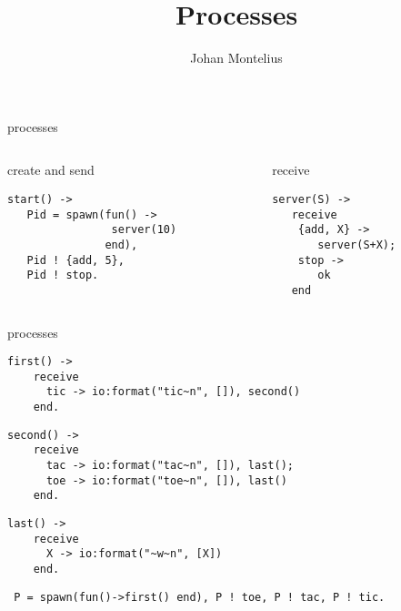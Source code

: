 

\title[ID1019 Processes]{Processes}


\author{Johan Montelius}
\date{\semester}



\begin{frame}
\titlepage
\end{frame}

\begin{frame}[fragile]{processes}

\begin{columns}
   \begin{column}{.5\linewidth}
     \begin{block}{create and send}
       \begin{verbatim}
start() ->
   Pid = spawn(fun() -> 
                server(10) 
               end),
   Pid ! {add, 5},
   Pid ! stop.
       \end{verbatim}
       \vfill
     \end{block}
   \end{column}
   \pause
   \begin{column}{.5\linewidth}
     \begin{block}{receive}
       \begin{verbatim}
server(S) ->
   receive
    {add, X} ->
       server(S+X);
    stop ->
       ok
   end
       \end{verbatim}
     \end{block}
   \end{column}
  \end{columns}
\end{frame}

\begin{frame}[fragile]{processes}
\begin{verbatim}
first() ->
    receive
      tic -> io:format("tic~n", []), second()
    end.
\end{verbatim}
\pause
\begin{verbatim}
second() ->
    receive
      tac -> io:format("tac~n", []), last();
      toe -> io:format("toe~n", []), last()
    end.
\end{verbatim}
\pause
\begin{verbatim}
last() ->
    receive 
      X -> io:format("~w~n", [X])
    end.
\end{verbatim}
\pause
\begin{verbatim}
 P = spawn(fun()->first() end), P ! toe, P ! tac, P ! tic.
\end{verbatim}
\end{frame}


